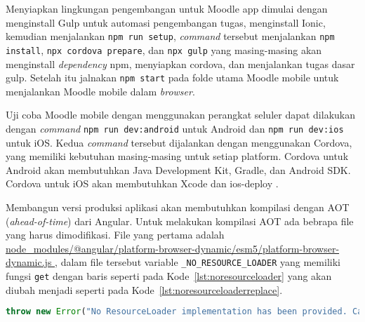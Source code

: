 Menyiapkan lingkungan pengembangan untuk Moodle app dimulai dengan menginstall Gulp untuk automasi pengembangan tugas, menginstall Ionic, kemudian menjalankan \texttt{npm run setup}, \textit{command} tersebut menjalankan \texttt{npm install}, \texttt{npx cordova prepare}, dan \texttt{npx gulp} yang masing-masing akan menginstall \textit{dependency} npm, menyiapkan cordova, dan menjalankan tugas dasar gulp. Setelah itu jalnakan \texttt{npm start} pada folde utama Moodle mobile untuk menjalankan Moodle mobile dalam \textit{browser}.

Uji coba Moodle mobile dengan menggunakan perangkat seluler dapat dilakukan dengan \textit{command} \texttt{npm run dev:android} untuk Android dan \texttt{npm run dev:ios} untuk iOS. Kedua \textit{command} tersebut dijalankan dengan menggunakan Cordova, yang memiliki kebutuhan masing-masing untuk setiap platform. Cordova untuk Android akan membutuhkan Java Development Kit, Gradle, dan Android SDK\cite{cordova:android}. Cordova untuk iOS akan membutuhkan Xcode dan ios-deploy \cite{cordova:iOS}.

Membangun versi produksi aplikasi akan membutuhkan kompilasi dengan AOT (\textit{ahead-of-time}) dari Angular. Untuk melakukan kompilasi AOT ada bebrapa file yang harus dimodifikasi. File yang pertama adalah \url{node_modules/@angular/platform-browser-dynamic/esm5/platform-browser-dynamic.js }, dalam file tersebut variable \texttt{\_NO\_RESOURCE\_LOADER} yang memiliki fungsi \texttt{get} dengan baris seperti pada \mbox{Kode \ref{lst:noresourceloader}} yang akan diubah menjadi seperti pada \mbox{Kode \ref{lst:noresourceloaderreplace}}.

\begin{lstlisting}[frame=single, label={lst:noresourceloader}, language=PHP, caption=Fungsi \texttt{get} pada \textunderscore NO\textunderscore RESOURCE\textunderscore LOADER]
throw new Error("No ResourceLoader implementation has been provided. Can't read the url \"" + url + "\"");
\end{lstlisting}

